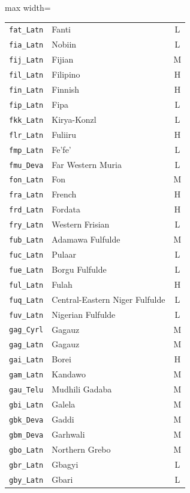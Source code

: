 {\begin{adjustbox}{max width=\textwidth}
\begin{tabular}{llc}
        \texttt{fat\_Latn} & Fanti & L \\
        \texttt{fia\_Latn} & Nobiin & L \\
        \texttt{fij\_Latn} & Fijian & M \\
        \texttt{fil\_Latn} & Filipino & H \\
        \texttt{fin\_Latn} & Finnish & H \\
        \texttt{fip\_Latn} & Fipa & L \\
        \texttt{fkk\_Latn} & Kirya-Konz\textschwa{}l & L \\
        \texttt{flr\_Latn} & Fuliiru & H \\
        \texttt{fmp\_Latn} & Fe'fe' & L \\
        \texttt{fmu\_Deva} & Far Western Muria & L \\
        \texttt{fon\_Latn} & Fon & M \\
        \texttt{fra\_Latn} & French & H \\
        \texttt{frd\_Latn} & Fordata & H \\
        \texttt{fry\_Latn} & Western Frisian & L \\
        \texttt{fub\_Latn} & Adamawa Fulfulde & M \\
        \texttt{fuc\_Latn} & Pulaar & L \\
        \texttt{fue\_Latn} & Borgu Fulfulde & L \\
        \texttt{ful\_Latn} & Fulah & H \\
        \texttt{fuq\_Latn} & Central-Eastern Niger Fulfulde & L \\
        \texttt{fuv\_Latn} & Nigerian Fulfulde & L \\
        \texttt{gag\_Cyrl} & Gagauz & M \\
        \texttt{gag\_Latn} & Gagauz & M \\
        \texttt{gai\_Latn} & Borei & H \\
        \texttt{gam\_Latn} & Kandawo & M \\
        \texttt{gau\_Telu} & Mudhili Gadaba & M \\
        \texttt{gbi\_Latn} & Galela & M \\
        \texttt{gbk\_Deva} & Gaddi & M \\
        \texttt{gbm\_Deva} & Garhwali & M \\
        \texttt{gbo\_Latn} & Northern Grebo & M \\
        \texttt{gbr\_Latn} & Gbagyi & L \\
        \texttt{gby\_Latn} & Gbari & L \\

\end{tabular}
\end{adjustbox}}
